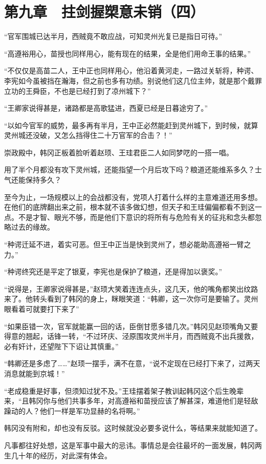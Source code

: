 \section{第九章　拄剑握槊意未销（四）}

“官军围城已达半月，西贼竟不敢应战，可知灵州光复已是指日可待。”

“高遵裕用心，苗授也同样用心，能有现在的结果，全是他们用命王事的结果。”

“不仅仅是高苗二人，王中正也同样用心，他沿着黄河走，一路过关斩将，种谔、李宪如今虽被挡在瀚海，但之前也多有功绩。别说他们这几位主帅，就是那个戴罪立功的王舜臣，不也是已经打到了凉州城下？”

“王卿家说得甚是，诸路都是高歌猛进，西夏已经是日暮途穷了。”

“以如今官军的威势，最多再有半月，王中正必然能赶到灵州城下，到时候，就算灵州城还没破，又怎么挡得住二十万官军的合击？！”

崇政殿中，韩冈正板着脸听着赵顼、王珪君臣二人如同梦呓的一搭一唱。

用了半个月都没有攻下灵州城，还能指望一个月后攻下吗？粮道还能维系多久？士气还能保持多久？

至今为止，一场规模以上的会战都没有，党项人打着什么样的主意难道还用多想。在他们的底牌翻出来之前，根本就不该多做幻想，但天子和王珪偏偏都看不到这一点。不是才智、眼光不够，而是他们下意识的将所有与危险有关的征兆和念头都忽略过去的缘故。

“种谔迁延不进，着实可恶。但王中正当是快到灵州了，想必能助高遵裕一臂之力。”

“种谔终究还是平定了银夏，李宪也是保护了粮道，还是得加以褒奖。”

“说得是，王卿家说得甚是，”赵顼大笑着连连点头，这几天，他的嘴角都笑出纹路来了。他转头看到了韩冈的身上，眯眼笑道：“韩卿，这一次你可是要输了。灵州眼看着可就要打下来了”

“如果臣错一次，官军就能赢一回的话，臣倒甘愿多错几次。”韩冈见赵顼嘴角又要得意的翘起，话锋一转，“不过环庆、泾原围攻灵州半月，而西贼竟不出兵援救，必有奸计，还望陛下下诏让其慎重。”

“韩卿还是多虑了……”赵顼一摆手，满不在意，“说不定现在已经打下来了，过两天消息就能到京城！”

“老成稳重是好事，但须知过犹不及。”王珪摆着架子教训起韩冈这个后生晚辈来，“且韩冈你与他们共事多年，对高遵裕和苗授应该了解甚深，难道他们是轻敌躁动的人？他们一样是军功显赫的名将啊。”

韩冈没有附和，却也没有反驳。这时候就没必要多说什么，等结果来就能知道了。

凡事都往好处想，这是军事中最大的忌讳。事情总是会往最坏的一面发展，韩冈两生几十年的经历，对此深有体会。

